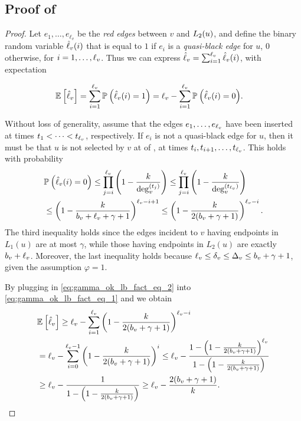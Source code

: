 \subsection{Proof of }\label{apx:proof_gamma_ok_expect_lowerbound}
\begin{proof}
Let $e_1, \dots, e_{\ell_v}$ be the \emph{red edges} between $v$ and $L_2(u)$, and define the binary random variable $\hat{\ell}_v(i)$ that is equal to $1$ if $e_i$ is a \emph{quasi-black edge} for $u$, $0$ otherwise, for $i = 1, \dots, \ell_v$. Thus we can express $\hat{\ell}_v = \sum_{i=1}^{\ell_v} \hat{\ell}_v(i)$, with expectation

\begin{equation}\label{eq:gamma_ok_lb_fact_eq_1}
\begin{aligned}
  \mathbb{E}_{} \left[ \hat{\ell}_v \right] & = \sum_{i=1}^{\ell_v}{\mathbb{P}_{} \left( \hat{\ell}_v(i)=1 \right)} = \ell_v - \sum_{i=1}^{\ell_v} {\mathbb{P}_{} \left( \hat{\ell}_v(i)=0 \right)}.
\end{aligned}
\end{equation}

Without loss of generality, assume that the edges $e_1, \dots, e_{\ell_v}$ have been inserted at times $t_1 < \dots < t_{\ell_v}$, respectively.
If $e_i$ is not a quasi-black edge for $u$, then it must be that $u$ is not selected by $v$ at  of , at times $t_i, t_{i+1},\dots, t_{\ell_v}$.
This holds with probability 
\begin{equation}\label{eq:gamma_ok_lb_fact_eq_2}
\begin{aligned} 
    &\mathbb{P}_{} \left( \hat{\ell}_v(i) = 0 \right)
    \leq \prod_{j=i}^{\ell_v} \left( 1-\frac{k}{\deg_v^{(t_j)}} \right)
    \leq \prod_{j=i}^{\ell_v} \left( 1 - \frac{k}{\deg_{v}^{(t_{\ell_v})}} \right) \\
    &\leq \left( 1-\frac{k}{b_v + \ell_v + \gamma + 1}\right)^{\ell_v - i + 1} 
    \leq \left(1-\frac{k}{2(b_v + \gamma + 1)}\right)^{\ell_v - i}.
\end{aligned}
\end{equation}
The third inequality holds since the edges incident to $v$ having endpoints in $L_1(u)$ are at most $\gamma$, while those having endpoints in $L_2(u)$ are exactly $b_v+ \ell_v$. Moreover, the last inequality holds because $\ell_v \leq \delta_v \leq \Delta_v \leq b_v + \gamma + 1$, given the assumption $\varphi = 1$.

By plugging in \eqref{eq:gamma_ok_lb_fact_eq_2} into   \eqref{eq:gamma_ok_lb_fact_eq_1} and we obtain
\begin{align*}
    &\mathbb{E}_{} \left[ \hat{\ell}_v \right] \geq \ell_v - \sum_{i=1}^{\ell_v}\left( 1-\frac{k}{2(b_v + \gamma + 1)}\right)^{\ell_v - i} \\
    &= \ell_v - \sum_{i=0}^{\ell_v-1} \left(1-\frac{k}{2(b_v + \gamma + 1)}\right)^i 
    \leq \ell_v - \frac{1-\left(1-\frac{k}{2(b_v+\gamma+1)}\right)^{\ell_v}}{1-\left(1-\frac{k}{2(b_v + \gamma + 1)}\right)} \\
    &\geq \ell_v - \frac{1}{1-\left(1-\frac{k}{2(b_v + \gamma + 1)}\right)}
    \geq \ell_v - \frac{2(b_v + \gamma + 1)}{k}.
\end{align*}
\end{proof}